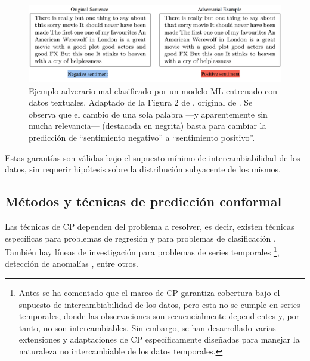 \begin{figure}[h]
    \centering
    \includegraphics[width=\textwidth]{capitulos/cap_02/imagenes/adversarial_example.png}
    \caption[
        Ejemplo adverario mal clasificado por un modelo ML entrenado con datos textuales.
        Adaptado de la Figura 2 de \cite{hullermeier2021}, original de \cite{sato2018}.
    ]{
        Ejemplo adverario mal clasificado por un modelo ML entrenado con datos textuales.
        Adaptado de la Figura 2 de \cite{hullermeier2021}, original de \cite{sato2018}.
        Se observa que el cambio de una sola palabra ---y aparentemente sin mucha relevancia--- (destacada en 
        negrita) basta para cambiar la predicción de ``sentimiento negativo'' a ``sentimiento positivo''.
    } 
    \label{fig:adversarial_example}
\end{figure}

Estas garantías son válidas bajo el supuesto mínimo de intercambiabilidad de los datos, sin requerir 
hipótesis sobre la distribución subyacente de los mismos.


\subsection{Métodos y técnicas de predicción conformal}

Las técnicas de CP dependen del problema a resolver, es decir, existen técnicas específicas para problemas
de regresión \cite{papadopoulos2002, romano2019, bethell2024} y para problemas de clasificación 
\cite{sadinle2019, romano2020, angelopoulos2020}. También hay líneas de investigación para problemas de 
series temporales \cite{xu2021, zaffran2022, stankeviciute2021}
\footnote{
    Antes se ha comentado que el marco de CP garantiza cobertura bajo el supuesto de intercambiabilidad de los
    datos, pero esta no se cumple en series temporales, donde las observaciones son secuencialmente 
    dependientes y, por tanto, no son intercambiables.
    Sin embargo, se han desarrollado varias extensiones y adaptaciones de CP específicamente diseñadas para 
    manejar la naturaleza no intercambiable de los datos temporales.
}, 
detección de anomalías \cite{laxhammar2015}, entre otros. 

